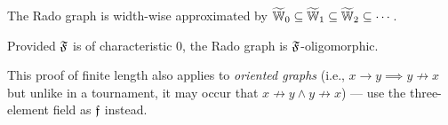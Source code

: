\begin{theorem}
    The Rado graph is width-wise approximated by $\widetilde {\mathbb{W}}_0 \subseteq \widetilde {\mathbb{W}}_1 \subseteq \widetilde {\mathbb{W}}_2 \subseteq \cdots$.
\end{theorem}

\begin{corollary}
    Provided $\mathfrak{F}$ is of characteristic $0$, the Rado graph is $\mathfrak{F}$-oligomorphic.
\end{corollary}

This proof of finite length also applies to \emph{oriented graphs} (i.e., $x \to y \implies y \not\to x$ but unlike in a tournament, it may occur that $x \not\to y \wedge y \not\to x$)
--- use the three-element field as $\mathfrak{f}$ instead.